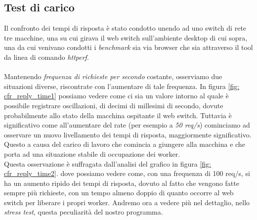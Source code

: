 \documentclass[italian]{tktltiki2}
\begin{document}
\subsection{Test di carico}
Il confronto dei tempi di risposta è stato condotto unendo ad uno switch di rete tre macchine, una su cui girava il web switch sull'ambiente desktop di cui sopra, una da cui venivano condotti i \emph{benchmark} sia via browser che sia attraverso il tool da linea di comando \emph{httperf}. \\\\
Mantenendo \emph{frequenza di richieste per secondo} costante, osserviamo due situazioni diverse, riscontrate con l'aumentare di tale frequenza. In figura \ref{fig: cfr_reply_time1} possiamo vedere come ci sia un valore intorno al quale è possibile registrare oscillazioni, di decimi di millesimi di secondo, dovute probabilmente allo stato della macchina ospitante il web switch. Tuttavia è significativo come all'aumentare del rate (per esempio a \emph{50 req/s}) cominciamo ad osservare un nuovo livellamento dei tempi di risposta, maggiormente significativo. Questo a causa del carico di lavoro che comincia a giungere alla macchina e che porta ad una situazione stabile di occupazione dei worker. \\ 
Questa osservazione è suffragata dall'analisi del grafico in figura \ref{fig: cfr_reply_time2}. dove possiamo vedere come, con una frequenza di 100 req/s, si ha un aumento ripido dei tempi di risposta, dovuto al fatto che vengono fatte sempre più richieste, con un tempo almeno doppio di quanto occorre al web switch per liberare i propri worker. Andremo ora a vedere più nel dettaglio, nello \emph{stress test}, questa peculiarità del nostro programma.
\end{document}
